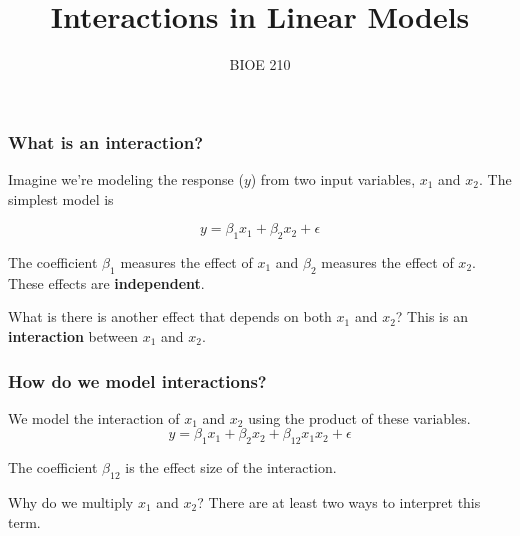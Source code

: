 \documentclass{beamer}
\title{Interactions in Linear Models}
\date{BIOE 210}
\begin{document}
\maketitle

\begin{frame}
\frametitle{What is an interaction?}	

Imagine we're modeling the response ($y$) from two input variables, $x_1$ and $x_2$. The simplest model is

\[ y = \beta_1x_1 + \beta_2x_2 + \epsilon \]

\pause
The coefficient $\beta_1$ measures the effect of $x_1$ and $\beta_2$ measures the effect of $x_2$. These effects are \textbf{independent}.

\bigskip
\pause
What is there is another effect that depends on both $x_1$ and $x_2$? This is an \textbf{interaction} between $x_1$ and $x_2$.
\end{frame}

\begin{frame}
\frametitle{How do we model interactions?}

We model the interaction of $x_1$ and $x_2$ using the product of these variables.
\[ y = \beta_1x_1 + \beta_2x_2 + \beta_{12}x_1x_2 + \epsilon \]

The coefficient $\beta_{12}$ is the effect size of the interaction.

\pause
\bigskip
Why do we multiply $x_1$ and $x_2$? There are at least two ways to interpret this term.
\end{frame}
\end{document}

